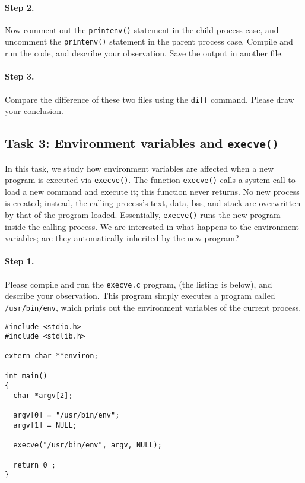 \paragraph{Step 2.} Now comment out the {\tt printenv()} statement in
the child process case, and uncomment the {\tt printenv()} statement in
the parent process case. Compile and run the code, and describe your 
observation. Save the output in another file.


\paragraph{Step 3.} Compare the difference of these two files using 
the {\tt diff} command. Please draw your conclusion.



\subsection{Task 3: Environment variables and {\tt execve()}}

In this task, we study how environment variables are affected
when a new program is 
executed via {\tt execve()}. The 
function {\tt execve()} calls a system call to load 
a new command and execute it; this function never returns. 
No new process is created; instead, the calling 
process's text,  data, bss, and stack  are overwritten by that of 
the program loaded. Essentially, {\tt execve()} runs the new program inside
the calling process. We are interested in what happens to the 
environment variables; are they automatically inherited by the 
new program?


\paragraph{Step 1.} Please compile and run the {\tt execve.c} program,
(the listing is below), and describe your observation. This program simply executes
a program called {\tt /usr/bin/env}, which prints out the environment
variables of the current process.

\begin{Verbatim}[frame=single]
#include <stdio.h>
#include <stdlib.h>

extern char **environ;

int main()
{
  char *argv[2];

  argv[0] = "/usr/bin/env"; 
  argv[1] = NULL;

  execve("/usr/bin/env", argv, NULL);

  return 0 ;
}
\end{Verbatim}


